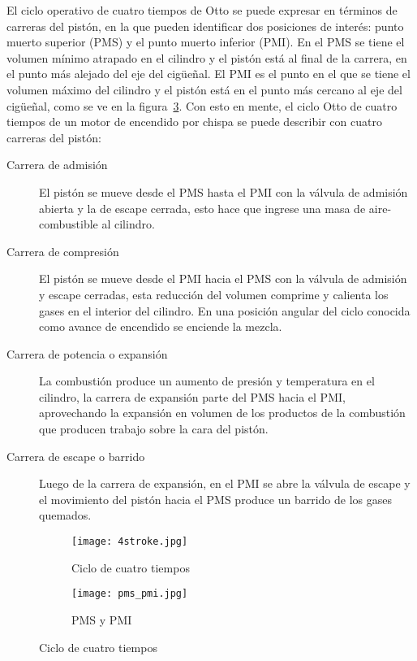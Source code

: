 El ciclo operativo de cuatro tiempos de Otto se puede expresar en términos de
carreras del pistón, en la que pueden identificar dos posiciones de interés:
punto muerto superior (PMS) y el punto muerto inferior (PMI).
%
En el PMS se tiene el volumen mínimo atrapado en el cilindro y el pistón está al
final de la carrera, en el punto más alejado del eje del cigüeñal.
%
El PMI es el punto en el que se tiene el volumen máximo del cilindro y el pistón
está en el punto más cercano al eje del cigüeñal, como se ve en la
figura~\ref{fig:pms_pmi}.
%
Con esto en mente, el ciclo Otto de cuatro tiempos de un motor de encendido por
chispa se puede describir con cuatro carreras del pistón:
%
\begin{description}
%
    \item [Carrera de admisión] El pistón se mueve desde el PMS hasta el PMI con
la válvula de admisión abierta y la de escape cerrada, esto hace que ingrese una
masa de aire-combustible al cilindro.
%
    \item [Carrera de compresión] El pistón se mueve desde el PMI hacia el PMS
con la válvula de admisión y escape cerradas, esta reducción del volumen
comprime y calienta los gases en el interior del cilindro.
        En una posición angular del ciclo conocida como avance de encendido se
enciende la mezcla.
%
    \item [Carrera de potencia o expansión] La combustión produce un aumento de
presión y temperatura en el cilindro, la carrera de expansión parte del PMS
hacia el PMI, aprovechando la expansión en volumen de los productos de la
combustión que producen trabajo sobre la cara del pistón.
%
    \item [Carrera de escape o barrido] Luego de la carrera de expansión, en el
PMI se abre la válvula de escape y el movimiento del pistón hacia el PMS produce
un barrido de los gases quemados.
%
\end{description}

\begin{figure}
  \centering
  \begin{subfigure}{0.6\textwidth}
    \centering
    \texttt{[image: 4stroke.jpg]}
    \caption{Ciclo de cuatro tiempos}\label{fig:4tiempos} %
  \end{subfigure}%
  \begin{subfigure}{0.4\textwidth}
    \centering
    \texttt{[image: pms\_pmi.jpg]}
    \caption{PMS y PMI}\label{fig:pms_pmi}
  \end{subfigure}
  \caption{Ciclo de cuatro tiempos}
\end{figure}


